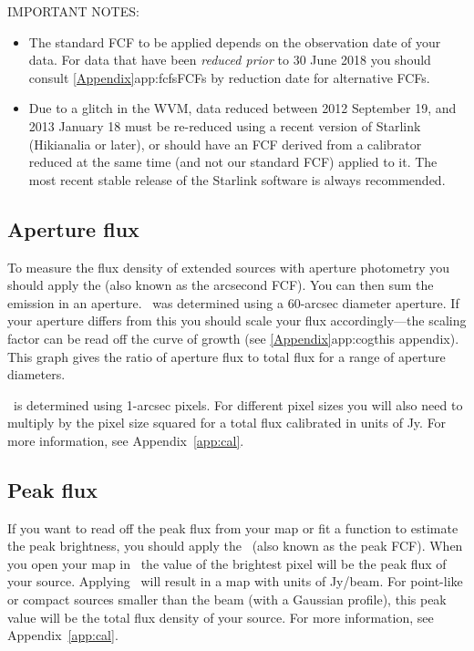 \begin{sltextbox}{IMPORTANT NOTES:}
  \begin{itemize}
  \item The standard FCF to be applied depends on the observation date
    of your data. For data that have been \emph{reduced prior} to
    30 June 2018 you should consult \cref{Appendix}{app:fcfs}{FCFs by
      reduction date} for alternative FCFs.

  \item Due to a glitch in the WVM, data reduced between 2012
    September 19, and 2013 January 18 must be re-reduced using a
    recent version of Starlink (Hikianalia or later), or should have
    an FCF derived from a calibrator reduced at the same time (and not
    our standard FCF) applied to it. The most recent stable release of
    the Starlink software is always recommended.
  \end{itemize}
\end{sltextbox}


\subsection{Aperture flux}

To measure the flux density of extended sources with aperture photometry
you should apply the \fcfa (also known as the arcsecond FCF).  
You can then sum the emission in an
aperture. \fcfa\ was determined using a 60-arcsec diameter
aperture. If your aperture differs from this you should scale your
flux accordingly---the scaling factor can be read off the curve of
growth (see \cref{Appendix}{app:cog}{this appendix}). This graph gives
the ratio of aperture flux to total flux for a range of aperture
diameters.

\fcfa\ is determined using 1-arcsec pixels. For different pixel sizes
you will also need to multiply by the pixel size squared for a total
flux calibrated in units of Jy. For more information, see 
Appendix~\ref{app:cal}.

\subsection{Peak flux}

If you want to read off the peak flux from your map or fit
a function to estimate the peak brightness, you should apply
the \fcfb\ (also known as the peak FCF).  When you open your map in
\gaia\ the value of the brightest pixel will be the peak flux of your
source. Applying \fcfb\ will result in a map with
units of Jy/beam. For point-like or compact sources smaller than the
beam (with a Gaussian profile), this peak value will be the total flux
density of your source. For more information, see Appendix~\ref{app:cal}.

